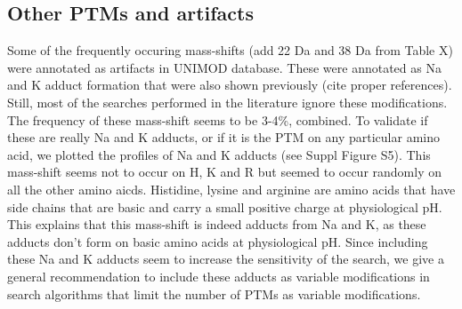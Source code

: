 \documentclass[12pt]{article}
\begin{document}
\subsection{Other PTMs and artifacts}

Some of the frequently occuring mass-shifts (add 22 Da and 38 Da from Table X) were annotated as artifacts in UNIMOD database. These were annotated as Na and K adduct formation that were also shown previously (cite proper references). Still, most of the searches performed in the literature ignore these modifications. The frequency of these mass-shift seems to be 3-4\%, combined. To validate if these are really Na and K adducts, or if it is the PTM on any particular amino acid, we plotted the profiles of Na and K adducts (see Suppl Figure S5). This mass-shift seems not to occur on H, K and R but seemed to occur randomly on all the other amino aicds. Histidine, lysine and arginine are amino acids that have side chains that are basic and carry a small positive charge at physiological pH. This explains that this mass-shift is indeed adducts from Na and K, as these adducts don't form on basic amino acids at physiological pH. Since including these Na and K adducts seem to increase the sensitivity of the search, we give a general recommendation to include these adducts as variable modifications in search algorithms that limit the number of PTMs as variable modifications. 
\end{document}
